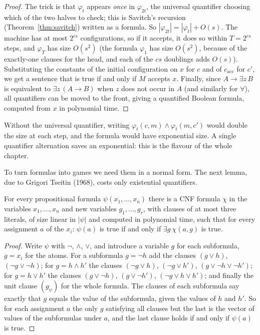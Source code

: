 \begin{proof}
The trick is that $\varphi_t$ appears \emph{once} in $\varphi_{2t}$, the universal quantifier choosing which of the two halves to check; this is Savitch's recursion (Theorem~\ref{thm:savitch}) written as a formula. So $|\varphi_{2t}|=|\varphi_t|+O(s)$. The machine has at most $2^{cs}$ configurations, so if it accepts, it does so within $T=2^{cs}$ steps, and $\varphi_T$ has size $O(s^2)$ (the formula $\varphi_1$ has size $O(s^2)$, because of the exactly-one clauses for the head, and each of the $cs$ doublings adds $O(s)$). Substituting the constants of the initial configuration on $x$ for $c$ and of $c_{\mathrm{acc}}$ for $c'$, we get a sentence that is true if and only if $M$ accepts $x$. Finally, since $A\to\exists z\,B$ is equivalent to $\exists z\,(A\to B)$ when $z$ does not occur in $A$ (and similarly for $\forall$), all quantifiers can be moved to the front, giving a quantified Boolean formula, computed from $x$ in polynomial time.
\end{proof}

Without the universal quantifier, writing $\varphi_t(c,m)\land\varphi_t(m,c')$ would double the size at each step, and the formula would have exponential size. A single quantifier alternation saves an exponential: this is the flavour of the whole chapter.

To turn formulas into games we need them in a normal form. The next lemma, due to Grigori Tseitin (1968), costs only existential quantifiers.

\begin{lemma}\label{lem:tseitin}
For every propositional formula $\psi(x_1,\dots,x_n)$ there is a CNF formula $\chi$ in the variables $x_1,\dots,x_n$ and new variables $g_1,\dots,g_r$, with clauses of at most three literals, of size linear in $|\psi|$ and computed in polynomial time, such that for every assignment $a$ of the $x_i$: $\psi(a)$ is true if and only if $\exists g\ \chi(a,g)$ is true.
\end{lemma}

\begin{proof}
Write $\psi$ with $\neg$, $\land$, $\lor$, and introduce a variable $g$ for each subformula, $g=x_i$ for the atoms. For a subformula $g=\neg h$ add the clauses $(g\lor h)$, $(\neg g\lor\neg h)$; for $g=h\land h'$ the clauses $(\neg g\lor h)$, $(\neg g\lor h')$, $(g\lor\neg h\lor\neg h')$; for $g=h\lor h'$ the clauses $(g\lor\neg h)$, $(g\lor\neg h')$, $(\neg g\lor h\lor h')$; and finally the unit clause $(g_\psi)$ for the whole formula. The clauses of each subformula say exactly that $g$ equals the value of the subformula, given the values of $h$ and $h'$. So for each assignment $a$ the only $g$ satisfying all clauses but the last is the vector of values of the subformulas under $a$, and the last clause holds if and only if $\psi(a)$ is true.
\end{proof}

